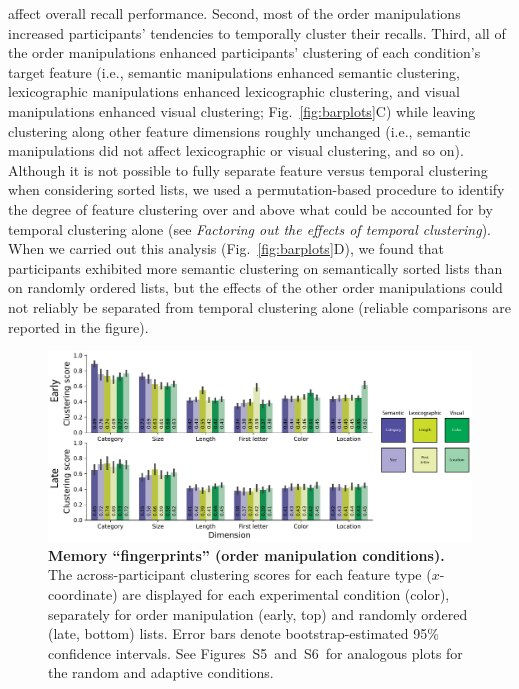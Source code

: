 \documentclass[11pt]{article}
\newcommand{\fingerprintsRandom}{S5}
\newcommand{\fingerprintsAdaptive}{S6}
\begin{document}
affect overall recall performance. Second, most of the order manipulations
increased participants' tendencies to temporally cluster their recalls. Third,
all of the order manipulations enhanced participants' clustering of each
condition's target feature (i.e., semantic manipulations enhanced semantic
clustering, lexicographic manipulations enhanced lexicographic clustering, and
visual manipulations enhanced visual clustering; Fig.~\ref{fig:barplots}C)
while leaving clustering along other feature dimensions roughly unchanged
(i.e., semantic manipulations did not affect lexicographic or visual
clustering, and so on). Although it is not possible to fully separate feature
versus temporal clustering when considering sorted lists, we used a
permutation-based procedure to identify the degree of feature clustering over
and above what could be accounted for by temporal clustering alone (see
\textit{Factoring out the effects of temporal clustering}). When we carried out
this analysis (Fig.~\ref{fig:barplots}D), we found that participants exhibited
more semantic clustering on semantically sorted lists than on randomly ordered
lists, but the effects of the other order manipulations could not reliably be
separated from temporal clustering alone (reliable comparisons are reported in
the figure).

\begin{figure}[tp] \centering
    \includegraphics[width=\textwidth]{figures/fingerprints}

\caption{\textbf{Memory ``fingerprints'' (order manipulation conditions).} The
across-participant clustering scores for each feature type ($x$-coordinate) are
displayed for each experimental condition (color), separately for order
manipulation (early, top) and randomly ordered (late, bottom) lists. Error bars
denote bootstrap-estimated 95\% confidence intervals. See
Figures~\fingerprintsRandom~and~\fingerprintsAdaptive~for analogous plots for
the random and adaptive conditions.} \label{fig:fingerprints}

\end{figure}
\end{document}
